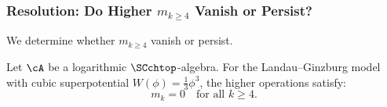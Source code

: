 \subsubsection{Resolution: Do Higher $m_{k \geq 4}$ Vanish or Persist?}

We determine whether $m_{k \geq 4}$ vanish or persist.

\begin{theorem}
Let\/ $\cA$ be a logarithmic\/ $\SCchtop$-algebra.
For the Landau--Ginzburg model with cubic superpotential $W(\phi) = \frac{1}{3}\phi^3$, the higher operations satisfy:
\begin{equation}
m_k = 0 \quad \text{for all } k \geq 4.
\end{equation}
\end{theorem}

